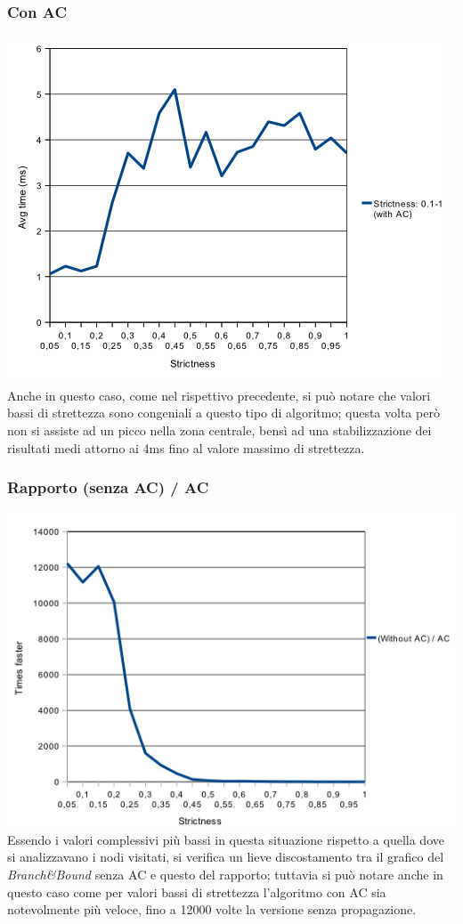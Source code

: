 \documentclass[a4paper,12pt,italian]{article}
\begin{document}
\subsubsection{Con AC}
\includegraphics[scale=0.8]{strictACTime.png}
\\
Anche in questo caso, come nel rispettivo precedente, si pu\`o notare che valori bassi
di strettezza sono congeniali a questo tipo di algoritmo; questa volta per\`o non si assiste ad
un picco nella zona centrale, bens\`i ad una stabilizzazione dei risultati medi attorno ai 4ms fino
al valore massimo di strettezza.

\subsubsection{Rapporto (senza AC) / AC}
\includegraphics[scale=0.8]{strictTimeQuotient.png}
\\
Essendo i valori complessivi pi\`u bassi in questa situazione rispetto a quella dove si analizzavano
i nodi visitati, si verifica un lieve discostamento tra il grafico del \textit{Branch\&Bound} senza AC e questo del rapporto; tuttavia
si pu\`o notare anche in questo caso come per valori bassi di strettezza l'algoritmo con AC sia notevolmente pi\`u
veloce, fino a 12000 volte la versione senza propagazione.
\end{document}

